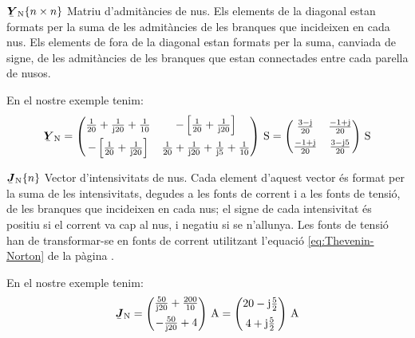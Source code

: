 \begin{list}{}
   {\setlength{\labelwidth}{20mm} \setlength{\leftmargin}{22mm} \setlength{\labelsep}{2mm}}

   \item[$\mcmplx{Y}\ped{N}\{n \times n\}$] Matriu d'admitàncies de nus. Els elements de la diagonal estan formats per la suma de les admitàncies de les branques que incideixen en cada nus.
   Els elements de fora de la diagonal estan formats per la suma, canviada de signe, de les admitàncies de les branques que estan connectades entre cada parella de nusos.

   En el nostre exemple tenim:
   \[
      \mcmplx{Y}\ped{N} =
      \begin{pmatrix}
            \frac{1}{20} + \frac{1}{\ju 20} +  \frac{1}{10} &
            -\left[\frac{1}{20} + \frac{1}{\ju 20}\right] \\[2mm]
            -\left[\frac{1}{20} + \frac{1}{\ju 20}\right]  &
            \frac{1}{20} + \frac{1}{\ju 20} +  \frac{1}{\ju 5} + \frac{1}{10}
      \end{pmatrix}\si{\,S} =
      \begin{pmatrix}
            \frac{3 - \ju}{20}  & \frac{-1 + \ju}{20} \\[2mm]
            \frac{-1 + \ju}{20} & \frac{3 - \ju 5}{20}
      \end{pmatrix}\si{\,S}
   \]

   \item[$\mcmplx{J}\ped{N}\{n\}$] Vector
d'intensivitats de nus. Cada element d'aquest vector és format per la suma de
les intensivitats, degudes a les fonts de corrent i a les fonts de tensió, de les
branques que incideixen en cada nus; el signe de cada intensivitat és positiu si el
corrent va cap al nus, i negatiu si se n'allunya. Les fonts de tensió han de
transformar-se en fonts de corrent utilitzant l'equació \eqref{eq:Thevenin-Norton} de
la pàgina \pageref{eq:Thevenin-Norton}.

   En el nostre exemple tenim:
   \[
      \mcmplx{J}\ped{N} =
      \begin{pmatrix}
            \frac{50}{\ju 20} +  \frac{200}{10} \\[2mm]
            - \frac{50}{\ju 20} + 4
      \end{pmatrix}\si{\,A} =
      \begin{pmatrix}
            20 - \ju \frac{5}{2} \\[2mm]
            4 + \ju \frac{5}{2}
      \end{pmatrix}\si{\,A}
   \]

\end{list}

